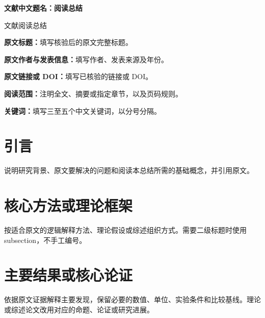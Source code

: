\documentclass[UTF8,fontset=fandol,zihao=-4,a4paper]{ctexart}
\DeclareMathOperator{\argmin}{arg\,min}
\begin{document}
\begin{center}
  {\bfseries 文献中文题名：阅读总结\par}
  \vspace{6bp}
  { 文献阅读总结\par}
\end{center}

\noindent\textbf{原文标题：}填写核验后的原文完整标题。\par
\noindent\textbf{原文作者与发表信息：}填写作者、发表来源及年份。\par
\noindent\textbf{原文链接或 DOI：}填写已核验的链接或 DOI。\par
\noindent\textbf{阅读范围：}注明全文、摘要或指定章节，以及页码规则。\par

\begin{abstract}
用中文连贯概括原文研究问题、方法、核心发现及局限。仅使用已核验信息，不把本总结表述为独立完成的原创研究。
\end{abstract}
\noindent\textbf{关键词：}填写三至五个中文关键词，以分号分隔。\par

\section{引言}
说明研究背景、原文要解决的问题和阅读本总结所需的基础概念，并引用原文\cite{source}。

\section{核心方法或理论框架}
按适合原文的逻辑解释方法、理论假设或综述组织方式。需要二级标题时使用 subsection，不手工编号。


\section{主要结果或核心论证}
依据原文证据解释主要发现，保留必要的数值、单位、实验条件和比较基线。理论或综述论文改用对应的命题、论证或研究进展。
\end{document}
